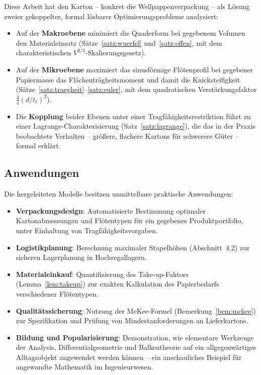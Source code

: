 ﻿\documentclass[a4paper,12pt]{article}
\theoremstyle{definition}
\begin{document}
Diese Arbeit hat den Karton -- konkret die Wellpappenverpackung -- als Lösung zweier
gekoppelter, formal lösbarer Optimierungsprobleme analysiert:

\begin{itemize}
	\item Auf der \textbf{Makroebene} minimiert die Quaderform bei gegebenem
	      Volumen den Materialeinsatz (Sätze~\ref{satz:wuerfel}
	      und~\ref{satz:offen}, mit dem charakteristischen
	      $V^{2/3}$-Skalierungsgesetz).
	\item Auf der \textbf{Mikroebene} maximiert das sinusförmige Flötenprofil
	      bei gegebener Papiermasse das Flächenträgheitsmoment und damit die
	      Knicksteifigkeit (Sätze~\ref{satz:traegheit}--\ref{satz:euler}, mit
	      dem quadratischen Verstärkungsfaktor $\tfrac{3}{4}(d/t_\ell)^2$).
	\item Die \textbf{Kopplung} beider Ebenen unter einer
	      Tragfähigkeitsrestriktion führt zu einer Lagrange-Charakterisierung
	      (Satz~\ref{satz:lagrange}), die das in der Praxis beobachtete
	      Verhalten -- größere, flachere Kartons für schwerere Güter --
	      formal erklärt.
\end{itemize}

\subsection{Anwendungen}

Die hergeleiteten Modelle besitzen unmittelbare praktische Anwendungen:

\begin{itemize}
	\item \textbf{Verpackungsdesign}: Automatisierte Bestimmung optimaler
	      Kartonabmessungen und Flötentypen für ein gegebenes
	      Produktportfolio, unter Einhaltung von Tragfähigkeitsvorgaben.
	\item \textbf{Logistikplanung}: Berechnung maximaler Stapelhöhen
	      (Abschnitt~4.2) zur sicheren Lagerplanung in Hochregallagern.
	\item \textbf{Materialeinkauf}: Quantifizierung des Take-up-Faktors
	      (Lemma~\ref{lem:takeup}) zur exakten Kalkulation des
	      Papierbedarfs verschiedener Flötentypen.
	\item \textbf{Qualitätssicherung}: Nutzung der McKee-Formel
	      (Bemerkung~\ref{bem:mckee}) zur Spezifikation und Prüfung von
	      Mindestanforderungen an Lieferkartons.
	\item \textbf{Bildung und Popularisierung}: Demonstration, wie
	      elementare Werkzeuge der Analysis, Differentialgeometrie und
	      Balkentheorie auf ein allgegenwärtiges Alltagsobjekt angewendet
	      werden können -- ein anschauliches Beispiel für angewandte
	      Mathematik im Ingenieurwesen.
\end{itemize}
\end{document}
